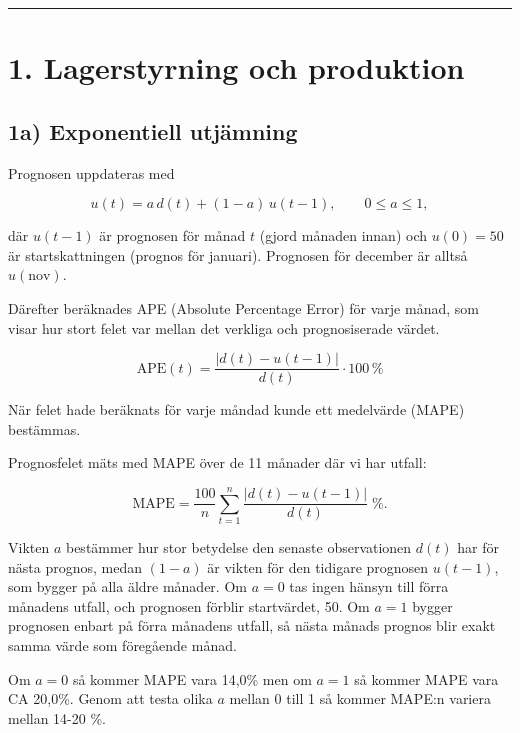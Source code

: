 \documentclass[11pt]{article}
\begin{document}
    \begin{center}\rule{0.5\linewidth}{0.5pt}\end{center}

\section{1. Lagerstyrning och
produktion}\label{lagerstyrning-och-produktion}

\subsection{1a) Exponentiell
utjämning}\label{a-exponentiell-utjuxe4mning}

Prognosen uppdateras med

\[u(t) = a\,d(t) + (1-a)\,u(t-1), \qquad 0 \le a \le 1, \tag{1}\]

där \(u(t-1)\) är prognosen för månad \(t\) (gjord månaden innan) och
\(u(0)=50\) är startskattningen (prognos för januari). Prognosen för
december är alltså \(u(\text{nov})\).

Därefter beräknades APE (Absolute Percentage Error) för varje månad, som
visar hur stort felet var mellan det verkliga och prognosiserade värdet.

\[
\mathrm{APE}(t) = \frac{\left| d(t) - u(t-1) \right|}{d(t)} \cdot 100\,\% \tag{2}\]

När felet hade beräknats för varje måndad kunde ett medelvärde (MAPE)
bestämmas.

Prognosfelet mäts med MAPE över de 11 månader där vi har utfall:

\[\text{MAPE} = \frac{100}{n}\sum_{t=1}^{n}\frac{|d(t)-u(t-1)|}{d(t)}\;\%. \tag{3}\]

Vikten \(a\) bestämmer hur stor betydelse den senaste observationen
\(d(t)\) har för nästa prognos, medan \((1-a)\) är vikten för den
tidigare prognosen \(u(t-1)\), som bygger på alla äldre månader. Om
\(a = 0\) tas ingen hänsyn till förra månadens utfall, och prognosen
förblir startvärdet, 50. Om \(a = 1\) bygger prognosen enbart på förra
månadens utfall, så nästa månads prognos blir exakt samma värde som
föregående månad.

Om \(a = 0\) så kommer MAPE vara 14,0\% men om \(a = 1\) så kommer MAPE
vara CA 20,0\%. Genom att testa olika \(a\) mellan 0 till 1 så kommer
MAPE:n variera mellan 14-20 \%.
\end{document}
